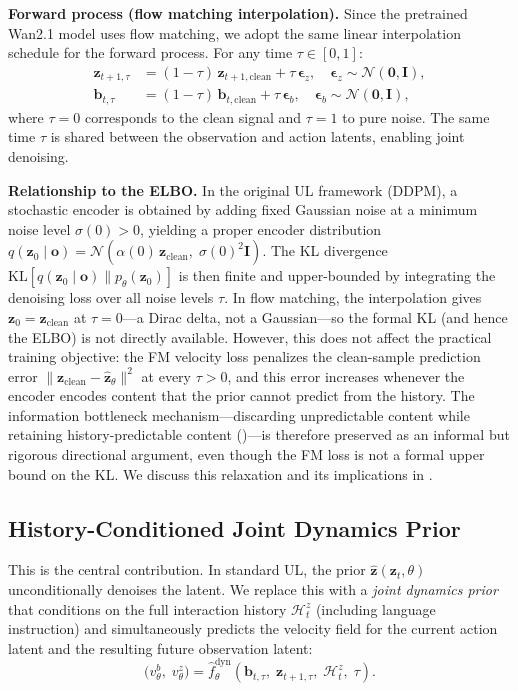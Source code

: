 \documentclass{article}
\newcommand{\vo}{\bm{o}}
\newcommand{\vz}{\bm{z}}
\newcommand{\vb}{\bm{b}}
\newcommand{\vep}{\bm{\epsilon}}
\newcommand{\KL}{\mathrm{KL}}
\begin{document}
\textbf{Forward process (flow matching interpolation).}
Since the pretrained Wan2.1 model uses flow matching, we adopt the same linear interpolation schedule for the forward process. For any time $\tau \in [0,1]$:
\begin{align}
  \vz_{t+1,\tau} &= (1-\tau)\,\vz_{t+1,\text{clean}} + \tau\,\vep_z, \quad \vep_z \sim \mathcal{N}(\bm{0}, \bm{I}),
  \label{eq:forward_latent} \\
  \vb_{t,\tau} &= (1-\tau)\,\vb_{t,\text{clean}} + \tau\,\vep_b, \quad \vep_b \sim \mathcal{N}(\bm{0}, \bm{I}),
  \label{eq:forward_action}
\end{align}
where $\tau = 0$ corresponds to the clean signal and $\tau = 1$ to pure noise.
The same time $\tau$ is shared between the observation and action latents, enabling joint denoising.

\textbf{Relationship to the ELBO.}
In the original UL framework (DDPM), a stochastic encoder is obtained by adding fixed Gaussian noise at a minimum noise level $\sigma(0) > 0$, yielding a proper encoder distribution $q(\vz_0 \mid \vo) = \mathcal{N}(\alpha(0)\,\vz_{\text{clean}},\; \sigma(0)^2 \bm{I})$.
The KL divergence $\KL[q(\vz_0 \mid \vo) \| p_\theta(\vz_0)]$ is then finite and upper-bounded by integrating the denoising loss over all noise levels $\tau$.
In flow matching, the interpolation gives $\vz_0 = \vz_{\text{clean}}$ at $\tau = 0$---a Dirac delta, not a Gaussian---so the formal KL (and hence the ELBO) is not directly available.
However, this does not affect the practical training objective: the FM velocity loss penalizes the clean-sample prediction error $\|\vz_{\text{clean}} - \hat{\vz}_\theta\|^2$ at every $\tau > 0$, and this error increases whenever the encoder encodes content that the prior cannot predict from the history.
The information bottleneck mechanism---discarding unpredictable content while retaining history-predictable content ()---is therefore preserved as an informal but rigorous directional argument, even though the FM loss is not a formal upper bound on the KL.
We discuss this relaxation and its implications in .

\subsection{History-Conditioned Joint Dynamics Prior}
\label{sec:ac_prior}

This is the central contribution. In standard UL, the prior $\hat{\vz}(\vz_t, \theta)$ unconditionally denoises the latent.
We replace this with a \emph{joint dynamics prior} that conditions on the full interaction history $\mathcal{H}_t^z$ (including language instruction) and simultaneously predicts the velocity field for the current action latent and the resulting future observation latent:
\begin{equation}
  \big(v_\theta^b,\; v_\theta^z\big) = \hat{f}_\theta^{\text{dyn}}\!\left(\vb_{t,\tau},\; \vz_{t+1,\tau},\; \mathcal{H}_t^z,\; \tau\right).
  \label{eq:dynamics_prior_pred}
\end{equation}
\end{document}
